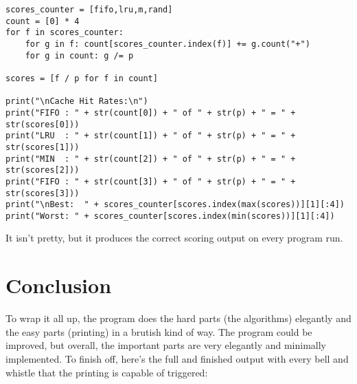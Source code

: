\documentclass[11pt]{article}
\begin{document}
\begin{lstlisting}
scores_counter = [fifo,lru,m,rand]
count = [0] * 4
for f in scores_counter:
	for g in f: count[scores_counter.index(f)] += g.count("+")
	for g in count: g /= p

scores = [f / p for f in count]

print("\nCache Hit Rates:\n")
print("FIFO : " + str(count[0]) + " of " + str(p) + " = " + str(scores[0]))
print("LRU  : " + str(count[1]) + " of " + str(p) + " = " + str(scores[1]))
print("MIN  : " + str(count[2]) + " of " + str(p) + " = " + str(scores[2]))
print("FIFO : " + str(count[3]) + " of " + str(p) + " = " + str(scores[3]))
print("\nBest:  " + scores_counter[scores.index(max(scores))][1][:4])
print("Worst: " + scores_counter[scores.index(min(scores))][1][:4])
\end{lstlisting}

It isn't pretty, but it produces the correct scoring output on every program run.

\section{Conclusion}

To wrap it all up, the program does the hard parts (the algorithms) elegantly and the easy parts (printing) in a brutish kind of way.
The program could be improved, but overall, the important parts are very elegantly and minimally implemented.
To finish off, here's the full and finished output with every bell and whistle that the printing is capable of triggered:
\end{document}
